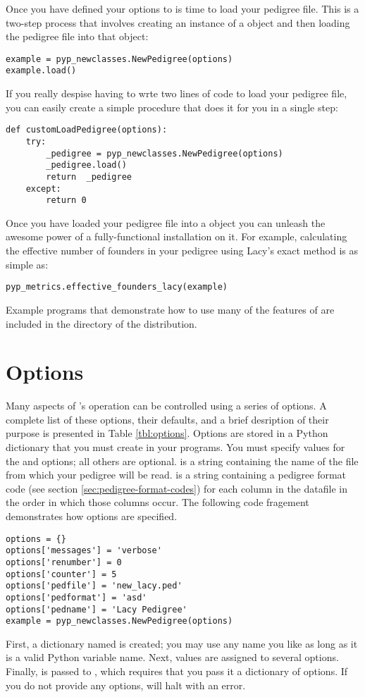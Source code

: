 Once you have defined your options to is time to load your pedigree file.  This is a two-step process that involves creating an instance of a  object and then loading the pedigree file into that object:
\begin{verbatim}
example = pyp_newclasses.NewPedigree(options)
example.load()
\end{verbatim}
If you really despise having to wrte two lines of code to load your pedigree file, you can easily create a simple procedure that does it for you in a single step:
\begin{verbatim}
def customLoadPedigree(options):
    try:
        _pedigree = pyp_newclasses.NewPedigree(options)
        _pedigree.load()
        return  _pedigree
    except:
        return 0
\end{verbatim}
Once you have loaded your pedigree file into a  object you can unleash the awesome power of a fully-functional \PyPedal{} installation on it.  For example, calculating the effective number of founders in your pedigree using Lacy's \citeyear{ref640} exact method is as simple as:
\begin{verbatim}
pyp_metrics.effective_founders_lacy(example)
\end{verbatim}
Example programs that demonstrate how to use many of the features of \PyPedal{} are included in the  directory of the distribution.
\section{Options}
\label{sec:pypedal-options}
Many aspects of \PyPedal{}'s operation can be controlled using a series of options.  A complete list of these options, their defaults, and a brief desription of their purpose is presented in Table \ref{tbl:options}.  Options are stored in a Python dictionary that you must create in your programs.  You must specify values for the  and  options; all others are optional.   is a string containing the name of the file from which your pedigree will be read.   is a string containing a pedigree format code (see section \ref{sec:pedigree-format-codes}) for each column in the datafile in the order in which those columns occur.  The following code fragement demonstrates how options are specified.
\begin{verbatim}
options = {}
options['messages'] = 'verbose'
options['renumber'] = 0
options['counter'] = 5
options['pedfile'] = 'new_lacy.ped'
options['pedformat'] = 'asd'
options['pedname'] = 'Lacy Pedigree'
example = pyp_newclasses.NewPedigree(options)
\end{verbatim}
First, a dictionary named  is created; you may use any name you like as long as it is a valid Python variable name.  Next, values are assigned to several options.  Finally,  is passed to , which requires that you pass it a dictionary of options.  If you do not provide any options, \PyPedal{} will halt with an error.

